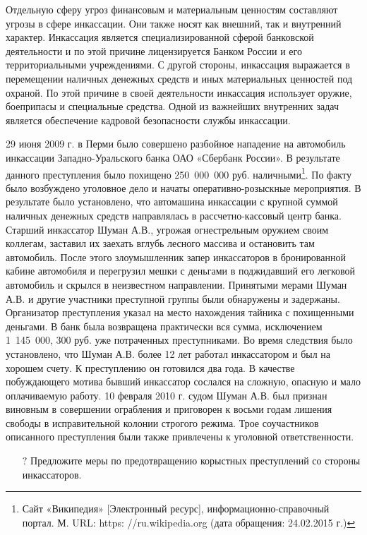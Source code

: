 \documentclass[a4paper,12pt,fleqn]{article} %
\begin{document}
Отдельную сферу угроз финансовым и материальным ценностям составляют угрозы в сфере инкассации. Они также носят как внешний, так и внутренний характер. Инкассация является специализированной сферой банковской деятельности и по этой причине лицензируется Банком России и его территориальными учреждениями. С другой стороны, инкассация выражается в перемещении наличных денежных средств и иных материальных ценностей под охраной. По этой причине в своей деятельности инкассация использует оружие, боеприпасы и специальные средства.  Одной из важнейших внутренних задач является обеспечение кадровой безопасности службы инкассации.\\


\begin{tcolorbox}[colback=blue!55!red!5!,colframe=blue!55!red,enforce breakable,%
	pad at break=1mm, title=Кейс 30. Чрезвычайное происшествие в Перми]
	
	29 июня 2009 г. в Перми было совершено разбойное нападение на автомобиль инкассации Западно-Уральского банка ОАО «Сбербанк России». В результате данного преступления было похищено 250 000 000 руб. наличными\footnote{Сайт «Википедия» [Электронный ресурс], информационно-справочный портал. М. URL: https: //ru.wikipedia.org (дата обращения: 24.02.2015 г.)}. По факту было возбуждено уголовное дело и начаты оперативно-розыскные мероприятия. В результате было установлено, что автомашина инкассации с крупной суммой наличных денежных средств направлялась в рассчетно-кассовый центр банка. Старший инкассатор Шуман А.В., угрожая огнестрельным оружием своим коллегам, заставил их заехать вглубь лесного массива и остановить там автомобиль. После этого злоумышленник запер инкассаторов в бронированной кабине автомобиля и перегрузил мешки с деньгами в поджидавший его легковой автомобиль и скрылся в неизвестном направлении. Принятыми мерами Шуман А.В. и другие участники преступной группы были обнаружены и задержаны. Организатор преступления указал на место нахождения тайника с похищенными деньгами. В банк была возвращена практически вся сумма, исключением 1 145 000, 300 руб. уже потраченных преступниками. Во время следствия было установлено, что Шуман А.В. более 12 лет работал инкассатором и был на хорошем счету. К преступлению он готовился два года. В качестве побуждающего мотива бывший инкассатор сослался на сложную, опасную и мало оплачиваемую работу. 10 февраля 2010 г. судом Шуман А.В. был признан виновным в совершении ограбления и приговорен к восьми годам лишения свободы в исправительной колонии строгого режима. Трое соучастников описанного преступления были также привлечены к уголовной ответственности.	

\begin{itemize}
	\item[{\color{blue!55!red}\Huge {  $ ? $}} \quad]   Предложите меры по предотвращению корыстных преступлений со стороны инкассаторов.
\end{itemize}	
	
\end{tcolorbox}
	
\end{document}
